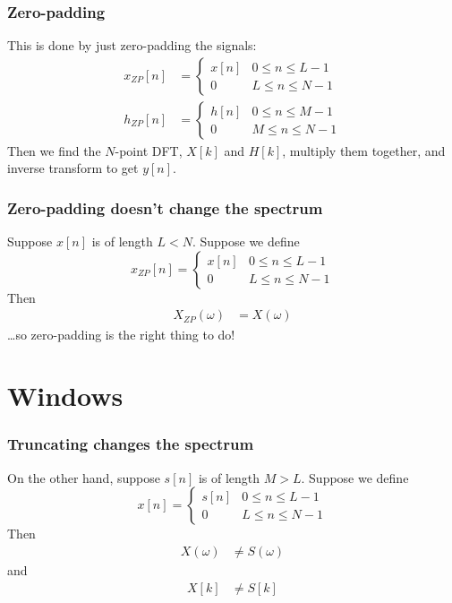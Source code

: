 \documentclass{beamer}
\begin{document}
\begin{frame}
  \frametitle{Zero-padding}

  This is done by just zero-padding the signals:
  \begin{align*}
    x_{ZP}[n] &=\begin{cases}x[n] & 0\le n\le L-1\\0 & L\le n\le N-1\end{cases}\\
    h_{ZP}[n] &=\begin{cases}h[n] & 0\le n\le M-1\\0 & M\le n\le N-1\end{cases}
  \end{align*}
  Then we find the $N$-point DFT, $X[k]$ and $H[k]$, multiply them
  together, and inverse transform to get $y[n]$.
\end{frame}
  
\begin{frame}
  \frametitle{Zero-padding doesn't change the spectrum}

  Suppose $x[n]$ is of length $L<N$.  Suppose we define
  \begin{displaymath}
    x_{ZP}[n] =\begin{cases}x[n] & 0\le n\le L-1\\
    0 & L\le n\le N-1
    \end{cases}
  \end{displaymath}
  Then
  \begin{align*}
    X_{ZP}(\omega) &= X(\omega)
  \end{align*}
  \ldots so zero-padding is the right thing to do!
\end{frame}

\section[Windows]{Windows}
\setcounter{subsection}{1}

\begin{frame}
  \frametitle{Truncating changes the spectrum}

  On the other hand, suppose $s[n]$ is of length $M>L$.  Suppose we define
  \begin{displaymath}
    x[n] =\begin{cases}s[n] & 0\le n\le L-1\\
    0 & L\le n\le N-1
    \end{cases}
  \end{displaymath}
  Then
  \begin{align*}
    X(\omega) &\ne S(\omega)
  \end{align*}
  and
  \begin{align*}
    X[k] &\ne S[k]
  \end{align*}
\end{frame}
\end{document}
